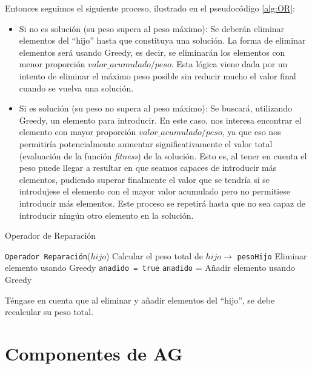 Entonces seguimos el siguiente proceso, ilustrado en el pseudocódigo \ref{alg:OR}:
\begin{itemize}
	\item Si no es solución (su peso supera al peso máximo): Se deberán eliminar elementos del ``hijo'' hasta que constituya una solución. 
La forma de eliminar elementos será usando Greedy, es decir, se eliminarán los elementos con menor proporción $valor\_acumulado/peso$. 
Esta lógica viene dada por un intento de eliminar el máximo peso posible sin reducir mucho el valor final cuando se vuelva una solución. 
	
	\item Si es solución (su peso no supera al peso máximo): Se buscará, utilizando Greedy, un elemento para introducir. 
En este caso, nos interesa encontrar el elemento con mayor proporción $valor\_acumulado/peso$, ya que eso nos permitiría potencialmente aumentar significativamente el valor total (evaluación de la función \textit{fitness}) de la solución. 
Esto es, al tener en cuenta el peso puede llegar a resultar en que seamos capaces de introducir más elementos, pudiendo superar finalmente el valor que se tendría si se introdujese el elemento con el mayor valor acumulado pero no permitiese introducir más elementos. 
Este proceso se repetirá hasta que no sea capaz de introducir ningún otro elemento en la solución. 
\end{itemize}


\begin{algorithm}[H]
\caption{Operador de Reparación}\label{alg:OR}
\begin{algorithmic}[1]
\Procedure \texttt{Operador Reparación}($hijo$)
\State Calcular el peso total de $hijo \xrightarrow{}{}$ \texttt{pesoHijo}
		\State Eliminar elemento usando Greedy
	\EndWhile
\Else
	\State \texttt{anadido = true} 
		\State \texttt{anadido} = Añadir elemento usando Greedy
	\EndWhile
\EndIf
\EndProcedure
\end{algorithmic}
\end{algorithm}

Téngase en cuenta que al eliminar y añadir elementos del ``hijo'', se debe recalcular su peso total.


\section{Componentes de AG}

